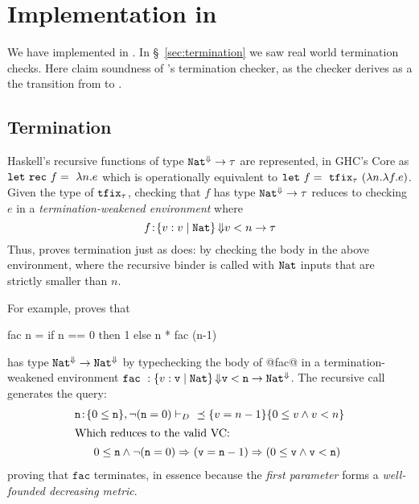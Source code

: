 
\newcommand\factyp{\typ}

\section{Implementation in \toolname}\label{sec:haskell}

We have implemented \declang in \toolname. 
% 
In \S~\ref{sec:termination} we saw real world termination checks.
%
Here claim soundness of \toolname's termination checker, 
as the checker derives as a the transition from \declang to \lhaskell.

\subsection{Termination}

Haskell's recursive functions of type ${{{\mathtt{Nat}}^{\Downarrow}} \rightarrow {\ensuremath{\tau}}}$ 
are represented, in GHC's Core \cite{SulzmannCJD07} as
${\mathtt{let\ rec}\ f = \ \lambda n. e}$ which is operationally
equivalent to ${\mathtt{let}\ f = \ \mathtt{tfix}_{\tau}\ (\lambda n. \lambda f. e)}$.
Given the type of $\mathtt{tfix}_{\tau}$, checking that $f$ has 
type ${{\mathtt{Nat}}^{\Downarrow}} \rightarrow {\ensuremath{\tau}}$ reduces to checking
$e$ in a \emph{termination-weakened environment} where
$${f\!:\!{\left\lbrace v : v\mid \mathtt{Nat}\right\rbrace{\ensuremath{\Downarrow}}{v < n}} \rightarrow {\ensuremath{\tau}}}$$
%
Thus, \toolname proves termination just as \declang 
does: by checking the body in the above environment, 
where the recursive binder is called with $\mathtt{Nat}$ 
inputs that are strictly smaller than $n$.

For example, \toolname proves that 
%
\begin{code}
  fac n = if n == 0 then 1 else n * fac (n-1)
\end{code}
%
has type ${{\mathtt{Nat}}^{\Downarrow}} \rightarrow {{\ensuremath{\mathtt{Nat}}}^{\ensuremath{\Downarrow}}}$ 
by typechecking the body of @fac@ 
in a termination-weakened environment 
${\mathtt{fac}\ : \tfunbasic{\tref{\ttv}{\tnat}{\finite}{\ttv < \ttn}}{\FinTy{\tnat}}}$.
The recursive call generates the query:
\begin{align*}
\tbind{\ttn}{\{0 \leq \ttn\}}, \lnot (\ttn = 0) \vdash_D &\  \subt{\ttref{v=n-1}}{\ttref{0 \leq v \wedge v < n}}\\ 
\intertext{Which reduces to the valid VC:}
0 \leq \ttn \wedge \lnot (\ttn = 0) \Rightarrow &\   (\ttv = \ttn-1) \Rightarrow (0 \leq \ttv \wedge \ttv < \ttn)
\end{align*}
%
proving that $\mathtt{fac}$ terminates, in essence because the
\emph{first parameter} forms a \emph{well-founded decreasing metric}.

